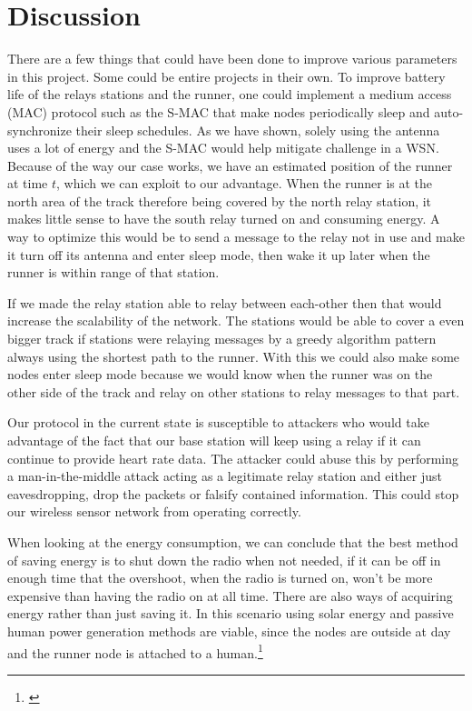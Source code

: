\section{Discussion}

There are a few things that could have been done to improve various parameters in this project. Some could be entire projects in their own. To improve battery life of the relays stations and the runner, one could implement a medium access (MAC) protocol such as the S-MAC that make nodes periodically sleep and auto-synchronize their sleep schedules. As we have shown, solely using the antenna uses a lot of energy and the S-MAC would help mitigate challenge in a WSN. Because of the way our case works, we have an estimated position of the runner at time $t$, which we can exploit to our advantage. When the runner is at the north area of the track therefore being covered by the north relay station, it makes little sense to have the south relay turned on and consuming energy. A way to optimize this would be to send a message to the relay not in use and make it turn off its antenna and enter sleep mode, then wake it up later when the runner is within range of that station.

\noindent If we made the relay station able to relay between each-other then that would increase the scalability of the network. The stations would be able to cover a even bigger track if stations were relaying messages by a greedy algorithm pattern always using the shortest path to the runner. With this we could also make some nodes enter sleep mode because we would know when the runner was on the other side of the track and relay on other stations to relay messages to that part.

\noindent Our protocol in the current state is susceptible to attackers who would take advantage of the fact that our base station will keep using a relay if it can continue to provide heart rate data. The attacker could abuse this by performing a man-in-the-middle attack acting as a legitimate relay station and either just eavesdropping, drop the packets or falsify contained information. This could stop our wireless sensor network from operating correctly.

\noindent When looking at the energy consumption, we can conclude that the best method of saving energy is to shut down the radio when not needed, if it can be off in enough time that the overshoot, when the radio is turned on, won't be more expensive than having the radio on at all time. There are also ways of acquiring energy rather than just saving it. In this scenario using solar energy and passive human power generation methods are viable, since the nodes are outside at day and the runner node is attached to a human.\footnote{\cite{Sudevalayam2011}}